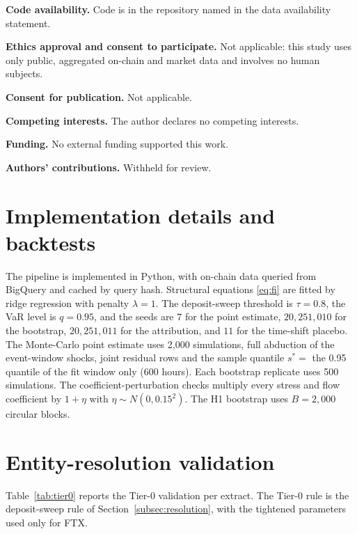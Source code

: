 \documentclass[referee,pdflatex,sn-mathphys-ay]{sn-jnl}
\theoremstyle{thmstyleone}%
\theoremstyle{thmstyletwo}%
\theoremstyle{thmstylethree}%
\begin{document}
\noindent\textbf{Code availability.} Code is in the repository named in the data availability statement.

\noindent\textbf{Ethics approval and consent to participate.} Not applicable: this study
uses only public, aggregated on-chain and market data and involves no human subjects.

\noindent\textbf{Consent for publication.} Not applicable.

\noindent\textbf{Competing interests.} The author declares no competing interests.

\noindent\textbf{Funding.} No external funding supported this work.

\noindent\textbf{Authors' contributions.} Withheld for review.

\begin{appendices}

\section{Implementation details and backtests}\label{app:impl}

The pipeline is implemented in Python, with on-chain data queried from BigQuery and cached by query hash. Structural equations
\eqref{eq:fi} are fitted by ridge regression with penalty $\lambda=1$. The deposit-sweep threshold is $\tau=0.8$, the VaR
level is $q=0.95$, and the seeds are $7$ for the point estimate, $20{,}251{,}010$ for the bootstrap, $20{,}251{,}011$ for the
attribution, and $11$ for the time-shift placebo. The Monte-Carlo point estimate uses 2{,}000 simulations, full abduction of
the event-window shocks, joint residual rows and the sample quantile $s^\ast=$ the 0.95 quantile of the fit window only
(600 hours). Each bootstrap replicate uses 500 simulations. The coefficient-perturbation checks multiply
every stress and flow coefficient by $1+\eta$ with $\eta\sim N(0,0.15^2)$. The H1 bootstrap uses $B=2{,}000$ circular blocks.

\section{Entity-resolution validation}\label{app:resolution}

Table~\ref{tab:tier0} reports the Tier-0 validation per extract. The Tier-0 rule is the deposit-sweep rule of
Section~\ref{subsec:resolution}, with the tightened parameters used only for FTX.


\end{appendices}
\end{document}
